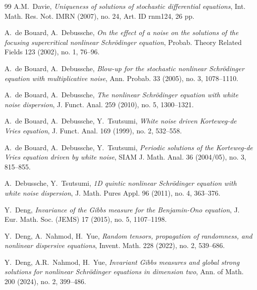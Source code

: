 \documentclass[letterpaper, 11pt,  reqno]{amsart}
\newcommand{\1}{\hspace{0.5mm}\text{I}\hspace{0.5mm}}
\numberwithin{equation}{section}
\numberwithin{theorem}{section}
\begin{document}
\begin{thebibliography}{99}
%
A.M.~Davie,
{\it Uniqueness of solutions of stochastic differential equations},
Int. Math. Res. Not. IMRN (2007), no. 24, Art. ID rnm124, 26 pp.






A.~de Bouard, A.~Debussche, 
{\it On the effect of a noise on the solutions of the focusing supercritical nonlinear Schr\"odinger equation},
Probab. Theory Related Fields 123 (2002), no. 1, 76--96.



A.~de Bouard, A.~Debussche, 
{\it Blow-up for the stochastic nonlinear Schr\"odinger equation with multiplicative noise},
Ann. Probab. 33 (2005), no. 3, 1078--1110.



A.~de Bouard, A.~Debussche, 
{\it The nonlinear Schr\"odinger equation with white noise dispersion},
J. Funct. Anal. 259 (2010), no. 5, 1300--1321. 



A.~de Bouard, A.~Debussche, Y.~Tsutsumi,
{\it White noise driven Korteweg-de Vries equation}, 
J. Funct. Anal. 169 (1999), no. 2, 532--558.


A.~de Bouard, A.~Debussche, Y.~Tsutsumi,
{\it Periodic solutions of the Korteweg-de Vries equation driven by white noise},
 SIAM J. Math. Anal. 36 (2004/05), no. 3, 815--855.
 
 
 
 

A.~Debussche, Y.~Tsutsumi, 
{\it 1D quintic nonlinear Schr\"odinger equation with white noise dispersion},
 J. Math. Pures Appl.  96 (2011), no. 4, 363--376. 


Y.~Deng,
{\it Invariance of the Gibbs measure for the Benjamin-Ono equation}, 
J. Eur. Math. Soc. (JEMS) 17 (2015), no. 5, 1107--1198.


 

Y.~Deng, A.~Nahmod,  H.~Yue,
{\it Random tensors, propagation of randomness, and
nonlinear dispersive equations}, 
Invent.
Math. 228 (2022), no. 2, 539--686.



Y.~Deng, A.R.~Nahmod, H.~Yue,
{\it Invariant Gibbs measures and global strong solutions for nonlinear Schr\"odinger equations in dimension two},
Ann. of Math.  200 (2024), no. 2, 399--486.


\end{thebibliography}
\end{document}
